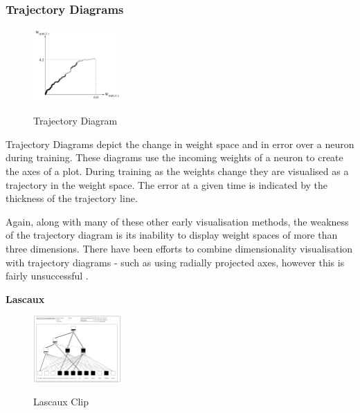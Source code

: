 \documentclass[a4paper,11pt,titlepage]{article}
\begin{document}
\subsubsection{Trajectory Diagrams}
		
 	\begin{figure}[H]
    			\centering	
			{{\includegraphics[width=0.3\textwidth]
    				{img/craven_trajectory.png} 
    			}}%
    			\caption{Trajectory Diagram}%
    		\label{fig:bond}
	\end{figure} 
 		
		Trajectory Diagrams \cite{Wejchert1990} depict the change in weight space and in error over a neuron during training. These diagrams use the incoming weights of a neuron to create the axes of a plot. During training as the weights change they are visualised as a trajectory in the weight space. The error at a given time is indicated by the thickness of the trajectory line.
		\par 	
		Again, along with many of these other early visualisation methods, the weakness of the trajectory diagram is its inability to display weight spaces of more than three dimensions. There have been efforts to combine dimensionality visualisation with trajectory diagrams - such as using radially projected axes, however this is fairly unsuccessful \cite{Craven1992}. 
		\par 
		
\textbf{Lascaux}
		
	\begin{figure}[H]
    			\centering	
			{{\includegraphics[width=0.3\textwidth]
    				{img/craven_weights.png} 
    			}}%
    			\caption{Lascaux Clip}%
    		\label{fig:lascaux}
	\end{figure}  		
 		
\end{document}
